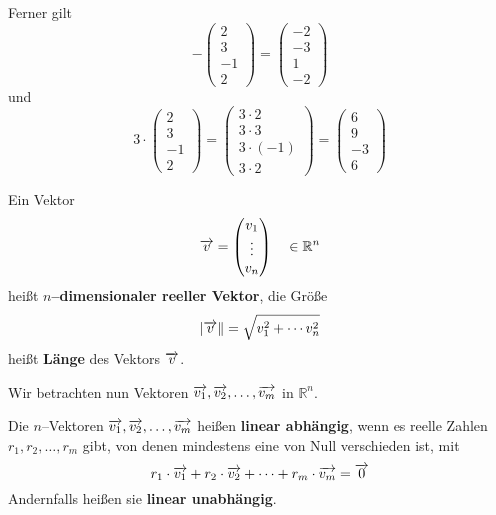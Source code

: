 \begin{beispiel}
Ferner gilt 
  	$$  - \left( \begin{matrix} 2 \\ 3 \\ -1 \\ 2 \end{matrix} \right) 
	= \left( \begin{matrix} -2 \\ -3 \\ 1 \\ -2 \end{matrix} \right) $$
und 
	$$ 3 \cdot \left( \begin{matrix} 2 \\ 3 \\ -1 \\ 2 \end{matrix} \right) =
	\left( \begin{matrix} 3 \cdot 2 \\ 3 \cdot 3 \\ 3 \cdot (-1) \\ 3 \cdot 2 \end{matrix} \right) = 
	\left( \begin{matrix} 6 \\ 9 \\ -3 \\ 6 \end{matrix} \right) $$
\end{beispiel}

\begin{definition}
Ein Vektor 
	$$ \overrightarrow{v} = \begin{pmatrix} v_1 \\ \vdots \\ v_n \end{pmatrix} \quad \in \mathbb R^n $$
heißt \textbf{$n$--dimensionaler reeller Vektor}, die Größe
	$$ \vert \overrightarrow{v} \Vert = \sqrt{v_1^2 + \cdots v_n^2} $$
heißt \textbf{Länge} des Vektors $\overrightarrow{v}$.
\end{definition}


\bigbreak

Wir betrachten nun Vektoren $\overrightarrow{v_1}, \overrightarrow{v_2}, \ldots, \overrightarrow{v_m}$ in $\mathbb R^n$. 

\begin{definition}\label{uvr_lin_unab} 
Die $n$--Vektoren  $\overrightarrow{v_1}, \overrightarrow{v_2}, \ldots, \overrightarrow{v_m}$ 
heißen \textbf{linear abhängig}, wenn 
es reelle Zahlen $r_1, r_2, \ldots, r_m$ gibt, von denen mindestens eine von Null verschieden ist, mit
  	$$ r_1 \cdot \overrightarrow{v_1} + r_2 \cdot  \overrightarrow{v_2} + \cdots + r_m 
     	\cdot \overrightarrow{v_m} = \overrightarrow{0} $$
Andernfalls heißen sie \textbf{linear unabhängig}.
\end{definition}

